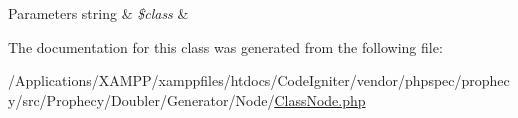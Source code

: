 \begin{DoxyParams}[1]{Parameters}
string & {\em \$class} & \\
\hline
\end{DoxyParams}


The documentation for this class was generated from the following file\+:\begin{DoxyCompactItemize}
\item 
/\+Applications/\+X\+A\+M\+P\+P/xamppfiles/htdocs/\+Code\+Igniter/vendor/phpspec/prophecy/src/\+Prophecy/\+Doubler/\+Generator/\+Node/\mbox{\hyperlink{_class_node_8php}{Class\+Node.\+php}}\end{DoxyCompactItemize}
